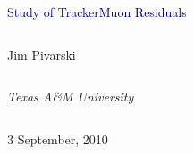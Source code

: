 \documentclass[compress]{beamer}
\begin{document}
\begin{frame}
\vfill
\begin{center}
\textcolor{darkblue}{\Large Study of TrackerMuon Residuals}

\vfill
\begin{columns}
\begin{center}
\large
Jim Pivarski
\end{center}
\end{columns}

\begin{columns}
\begin{center}
\scriptsize
{\it Texas A\&M University}
\end{center}
\end{columns}

\vfill
 3 September, 2010

\end{center}
\end{frame}


\small
\end{document}
